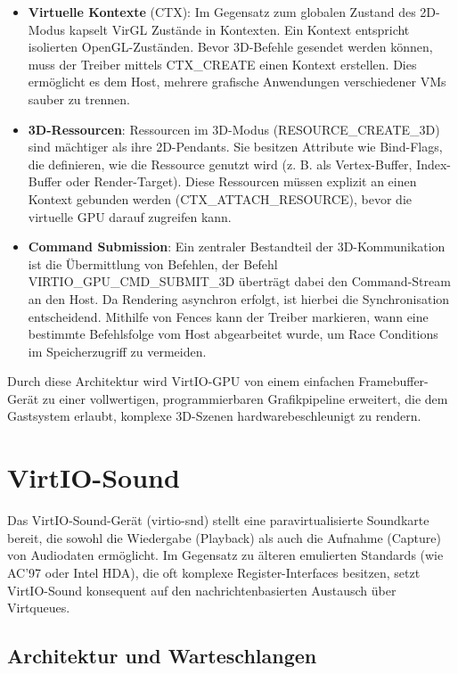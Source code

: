 \begin{itemize}
 \item \textbf{Virtuelle Kontexte} (CTX): Im Gegensatz zum globalen Zustand des 2D-Modus kapselt VirGL Zustände in Kontexten. Ein Kontext entspricht isolierten OpenGL-Zuständen. Bevor 3D-Befehle gesendet werden können, muss der Treiber mittels CTX\_CREATE einen Kontext erstellen. Dies ermöglicht es dem Host, mehrere grafische Anwendungen verschiedener VMs sauber zu trennen.
 \item \textbf{3D-Ressourcen}: Ressourcen im 3D-Modus (RESOURCE\_CREATE\_3D) sind mä\-chtiger als ihre 2D-Pendants. Sie besitzen Attribute wie Bind-Flags, die definieren, wie die Ressource genutzt wird (z. B. als Vertex-Buffer, Index-Buffer oder Render-Target). Diese Ressourcen müssen explizit an einen Kontext gebunden werden (CTX\_\allowbreak ATTACH\_RESOURCE), bevor die virtuelle GPU darauf zugreifen kann.
 \item \textbf{Command Submission}: Ein zentraler Bestandteil der 3D-Kommunikation ist die Übermittlung von Befehlen, der Befehl VIRTIO\_GPU\_CMD\_SUBMIT\_3D überträgt dabei den Command-Stream an den Host. Da Rendering asynchron erfolgt, ist hierbei die Synchronisation entscheidend. Mithilfe von Fences kann der Treiber markieren, wann eine bestimmte Befehlsfolge vom Host abgearbeitet wurde, um Race Conditions im Speicherzugriff zu vermeiden.
\end{itemize}

Durch diese Architektur wird VirtIO-GPU von einem einfachen Framebuffer-Gerät zu einer vollwertigen, programmierbaren Grafikpipeline erweitert, die dem Gastsystem erlaubt, komplexe 3D-Szenen hardwarebeschleunigt zu rendern.

\section{VirtIO-Sound}

Das VirtIO-Sound-Gerät (virtio-snd) stellt eine paravirtualisierte Soundkarte bereit, die sowohl die Wiedergabe (Playback) als auch die Aufnahme (Capture) von Audiodaten ermöglicht. Im Gegensatz zu älteren emulierten Standards (wie AC'97 oder Intel HDA), die oft komplexe Register-Interfaces besitzen, setzt VirtIO-Sound konsequent auf den nachrichtenbasierten Austausch über Virtqueues.

\subsection{Architektur und Warteschlangen}

